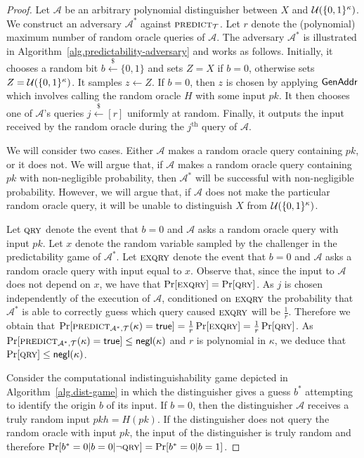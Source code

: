 \restateLemRoUnpredictability*
\begin{proof}
  Let $\mathcal{A}$ be an arbitrary polynomial distinguisher between
  $X$ and $\mathcal{U}(\{0, 1\}^\kappa)$.
  We construct an adversary $\mathcal{A}^*$
  against $\textsc{predict}_{\mathcal{T}}$.
  Let $r$ denote the (polynomial)
  maximum number of random oracle queries of $\mathcal{A}$.
  The adversary $\mathcal{A}^*$ is illustrated in
  Algorithm~\ref{alg.predictability-adversary} and works as follows.
  Initially, it chooses a random bit $b \stackrel{\$}{\gets} \{0, 1\}$ and
  sets $Z = X$ if $b = 0$, otherwise
  sets $Z = \mathcal{U}(\{0,1\}^\kappa)$.
  It samples $z \gets Z$.
  If $b = 0$, then $z$ is chosen by applying $\mathsf{GenAddr}$ which involves
  calling the random oracle $H$ with some input $pk$.
  It then chooses one of $\mathcal{A}$'s queries $j \stackrel{\$}{\gets} [r]$
  uniformly at random. Finally, it outputs the input received by the random
  oracle during the $j^\text{th}$ query of $\mathcal{A}$.

  We will consider two cases. Either $\mathcal{A}$ makes a random oracle query
  containing $pk$, or it does not. We will argue that, if $\mathcal{A}$ makes
  a random oracle query containing $pk$ with non-negligible probability, then
  $\mathcal{A}^*$ will be successful with non-negligible probability. However,
  we will argue that, if $\mathcal{A}$ does not make the particular random
  oracle query, it will be unable to distinguish $X$ from $\mathcal{U}(\{0,1\}^\kappa)$.

  Let $\textsc{qry}$ denote the event that $b = 0$ and $\mathcal{A}$ asks a random
  oracle query with input $pk$.
  Let $x$ denote the random variable sampled by the challenger in the
  predictability game of $\mathcal{A}^*$.
  Let $\textsc{exqry}$ denote the event that $b = 0$ and $\mathcal{A}$ asks a
  random oracle query with input equal to $x$. Observe that, since the input to
  $\mathcal{A}$ does not depend on $x$, we have that
  $\Pr[\textsc{exqry}] = \Pr[\textsc{qry}]$. As $j$ is chosen independently of the execution
  of $\mathcal{A}$, conditioned on $\textsc{exqry}$ the probability that
  $\mathcal{A}^*$ is able to correctly guess which query caused $\textsc{exqry}$ will
  be $\frac{1}{r}$. Therefore we obtain that
  $\Pr[\textsc{predict}_{\mathcal{A}^*,\mathcal{T}}(\kappa) = \mathsf{true}]
   = \frac{1}{r}\Pr[\textsc{exqry}]
   = \frac{1}{r}\Pr[\textsc{qry}]$.
  As
  $\Pr[\textsc{predict}_{\mathcal{A}^*,\mathcal{T}}(\kappa) = \mathsf{true}] \leq \textsf{negl}(\kappa)$
  and $r$
  is polynomial in $\kappa$, we deduce that $\Pr[\textsc{qry}] \leq \textsf{negl}(\kappa)$.

  Consider the computational
  indistinguishability game depicted in
  Algorithm~\ref{alg.dist-game} in which the distinguisher gives a guess $b^*$
  attempting to identify the origin $b$ of its input.
  If $b = 0$, then the distinguisher $\mathcal{A}$ receives a truly random input
  $pkh = H(pk)$.
  If the distinguisher does not query the random oracle
  with input $pk$, the input of the distinguisher is truly random
  and therefore $\Pr[b^* = 0|b = 0|\lnot \textsc{qry}] = \Pr[b^* = 0|b = 1]$.


\end{proof}
